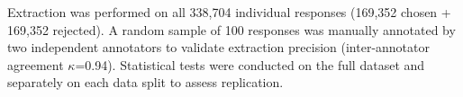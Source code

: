 
Extraction was performed on all 338,704 individual responses (169,352 chosen + 169,352 rejected). A random sample of 100 responses was manually annotated by two independent annotators to validate extraction precision (inter-annotator agreement $\kappa$=0.94). Statistical tests were conducted on the full dataset and separately on each data split to assess replication.
